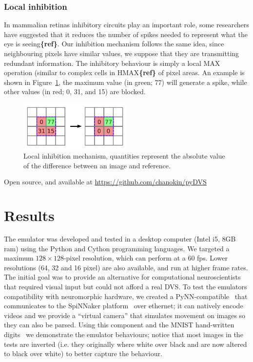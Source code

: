 \documentclass[twocolumn]{article}
\begin{document}
\subsubsection{Local inhibition} 
In mammalian retinas inhibitory circuits play an important role, some researchers have suggested that it reduces the number of spikes needed to represent what the eye is seeing\textbf{\{ref\}}. Our inhibition mechanism follows the same idea, since neighbouring pixels have similar values, we suppose that they are transmitting redundant information. The inhibitory behaviour is simply a local MAX operation (similar to complex cells in HMAX\textbf{\{ref\}} of pixel areas. An example is shown in Figure~\ref{fig:local_inh}, the maximum value (in green; 77) will generate a spike, while other values (in red; 0, 31, and 15) are blocked.

\begin{figure}[htb]

  \includegraphics[width=0.5\textwidth]{inh_local_max}
  \caption{Local inhibition mechanism, quantities represent the absolute value of the difference between an image and reference.}
  \label{fig:local_inh}
\end{figure}


Open source, and available at \url{https://github.com/chanokin/pyDVS}\\

\section{Results}

The emulator was developed and tested in a desktop computer (Intel i5, 8GB ram) using the Python and Cython programming languages. We targeted a maximum $128\times 128$-pixel resolution, which can perform at a 60 fps. Lower resolutions (64, 32 and 16 pixel) are also available, and run at higher frame rates. The initial goal was to provide an alternative for computational neuroscientists that required visual input but could not afford a real DVS. To test the emulators compatibility with neuromorphic hardware, we created a PyNN-compatible~\cite{pynn} that communicates to the SpiNNaker platform~\cite{spinnaker_overview} over ethernet; it can natively encode videos and we provide a ``virtual camera'' that simulates movement on images so they can also be parsed. Using this component and the MNIST hand-written digits~\cite{mnist} we demonstrate the emulator behaviours; notice that most images in the tests are inverted (i.e. they originally where white over black and are now altered to black over white) to better capture the behaviour.
\end{document}
